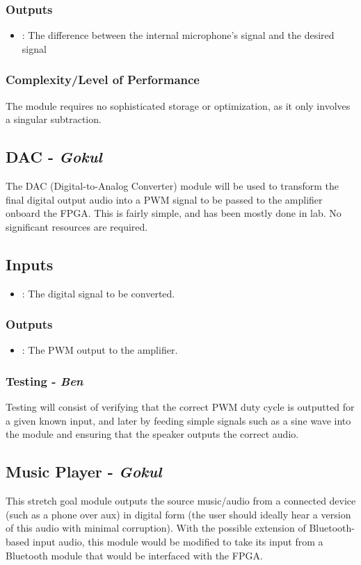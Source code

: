 \documentclass{fpgairpods}
\begin{document}
\begin{multicols*}{2}
\subsubsection{Outputs}
\begin{itemize}
    \item {}: The difference between the internal microphone's signal and the desired signal
\end{itemize}
\subsubsection{Complexity/Level of Performance}
The module requires no sophisticated storage or optimization, as it only involves a singular subtraction. 


\subsection{DAC - \textit{Gokul}}
The DAC (Digital-to-Analog Converter) module will be used to transform the final digital output audio into a PWM signal to be passed to the amplifier onboard the FPGA. This is fairly simple, and has been mostly done in lab. No significant resources are required.
\subsection{Inputs}
\begin{itemize}
    \item {}: The digital signal to be converted.
\end{itemize}
\subsubsection{Outputs}
\begin{itemize}
    \item {}: The PWM output to the amplifier.
\end{itemize}
\subsubsection{Testing - \textit{Ben}}
Testing will consist of verifying that the correct PWM duty cycle is outputted for a given known input, and later by feeding simple signals such as a sine wave into the module and ensuring that the speaker outputs the correct audio.

\subsection{Music Player - \textit{Gokul}}
This stretch goal module outputs the source music/audio from a connected device (such as a phone over aux) in digital form (the user should ideally hear a version of this audio with minimal corruption). With the possible extension of Bluetooth-based input audio, this module would be modified to take its input from a Bluetooth module that would be interfaced with the FPGA.

\end{multicols*}
\end{document}
